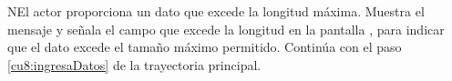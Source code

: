 \begin{UCtrayectoriaA}{N}{El actor proporciona un dato que excede la longitud máxima.}
    \UCpaso[\UCsist] Muestra el mensaje  y señala el campo que excede la 
    longitud en la pantalla , para indicar que el dato excede el tamaño máximo permitido.
    \UCpaso[] Continúa con el paso \ref{cu8:ingresaDatos} de la trayectoria principal.
 \end{UCtrayectoriaA}
 
